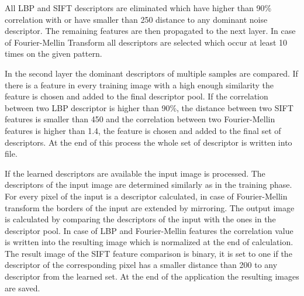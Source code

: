 \documentclass[draft,final]{vutinfth} %
\begin{document}
All LBP and SIFT descriptors are eliminated which have higher than 90\% correlation with or have smaller than 250 distance to any dominant noise descriptor.
The remaining features are then propagated to the next layer.
In case of Fourier-Mellin Transform all descriptors are selected which occur at least 10 times on the given pattern.
\par
In the second layer the dominant descriptors of multiple samples are compared.
If there is a feature in every training image with a high enough similarity the feature is chosen and added to the final descriptor pool.
If the correlation between two LBP descriptor is higher than 90\%, the distance between two SIFT features is smaller than 450 and the correlation between two Fourier-Mellin features is higher than 1.4, the feature is chosen and added to the final set of descriptors.
At the end of this process the whole set of descriptor is written into file.
\par
If the learned descriptors are available the input image is processed.
The descriptors of the input image are determined similarly as in the training phase.
For every pixel of the input is a descriptor calculated, in case of Fourier-Mellin transform the borders of the input are extended by mirroring.
The output image is calculated by comparing the descriptors of the input with the ones in the descriptor pool.
In case of LBP and Fourier-Mellin features the correlation value is written into the resulting image which is normalized at the end of calculation.
The result image of the SIFT feature comparison is binary, it is set to one if the descriptor of the corresponding pixel has a smaller distance than 200 to any descriptor from the learned set.
At the end of the application the resulting images are saved.
\end{document}
